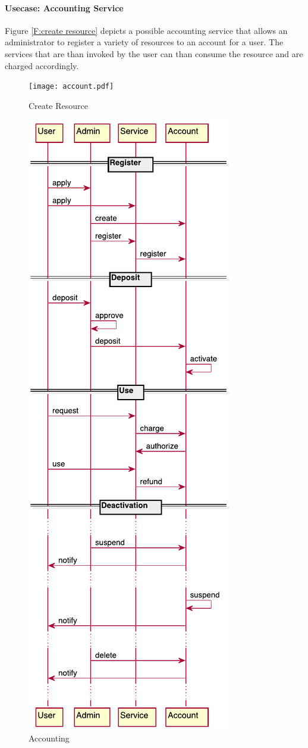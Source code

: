 \documentclass[10pt]{article}
\begin{document}


\paragraph{Usecase: Accounting Service}

Figure \ref{F:create resource} depicts a possible accounting service that allows an administrator to register a variety of resources to an account for a user. The services that are than invoked by the user can than consume the resource and are charged accordingly.

\begin{figure}[!h]
\texttt{[image: account.pdf]}
\caption{Create Resource}\label{F:createresource}
\end{figure}

\begin{figure}[!h]
\centering
\includegraphics[width=0.5\columnwidth]{uml/account.pdf}
\caption{Accounting}\label{F:uml-accounting}
\end{figure}
\end{document}
